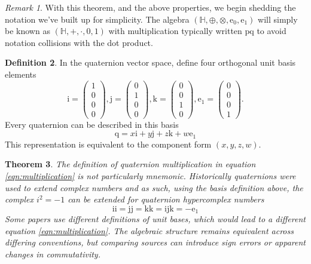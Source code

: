 \documentclass{amsart}
\newtheorem{theorem}{Theorem}[section]
\theoremstyle{definition}
\newtheorem{definition}[theorem]{Definition}
\theoremstyle{remark}
\newtheorem{remark}[theorem]{Remark}
\numberwithin{equation}{section}
\begin{document}
\begin{remark}
  With this theorem, and the above properties, we begin shedding the notation we've built up for simplicity. The algebra $(\mathbb{H}, \oplus, \otimes, \mathrm{e}_0, \mathrm{e}_1)$ will simply be known as $(\mathbb{H}, +, \cdot, 0, 1)$ with multiplication typically written $\mathrm{p}\mathrm{q}$ to avoid notation collisions with the dot product.
\end{remark}

\begin{definition}
  In the quaternion vector space, define four orthogonal unit basis elements
  \begin{equation}
    \mathrm{i} =
    \begin{pmatrix}
      1 \\
      0 \\
      0 \\
      0
    \end{pmatrix},
    \mathrm{j} =
    \begin{pmatrix}
      0 \\
      1 \\
      0 \\
      0
    \end{pmatrix}, 
    \mathrm{k} =
    \begin{pmatrix}
      0 \\
      0 \\
      1 \\
      0
    \end{pmatrix}, 
    \mathrm{e}_1 =
    \begin{pmatrix}
      0 \\
      0 \\
      0 \\
      1
    \end{pmatrix}.
  \end{equation}
  Every quaternion can be described in this basis
  \begin{equation}
    \mathrm{q} = x \mathrm{i} + y \mathrm{j} + z \mathrm{k} + w \mathrm{e}_1
  \end{equation}
  This representation is equivalent to the component form $(x, y, z, w)$.
\end{definition}

\begin{theorem}
  The definition of quaternion multiplication in equation \ref{eqn:multiplication} is not particularly mnemonic.
  Historically quaternions were used to extend complex numbers and as such, using the basis definition above, the complex $i^2=-1$ can be extended for quaternion hypercomplex numbers
  \begin{equation}
    \mathrm{ii} = \mathrm{jj} = \mathrm{kk} = \mathrm{ijk} = -\mathrm{e}_1
  \end{equation}
  Some papers use different definitions of unit bases, which would lead to a different equation \ref{eqn:multiplication}.
  The algebraic structure remains equivalent across differing conventions, but comparing sources can introduce sign errors or apparent changes in commutativity.
\end{theorem}
\end{document}
